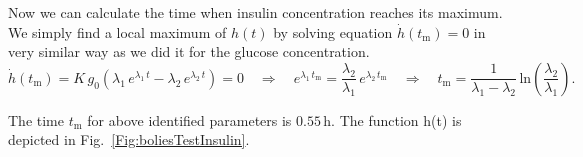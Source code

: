 \documentclass{article}
\providecommand{\m}[1]{\ensuremath{\mathrm{#1}}}
\begin{document}
Now we can calculate the time when insulin concentration reaches its maximum. We simply find a local maximum of $h(t)$ by solving equation $\dot{h}(t_\m{m})=0$ in very similar way as we did it for the glucose concentration.
\begin{equation*}
	\dot{h}(t_\m{m}) = K\,g_0 \left( \lambda_1\,e^{\lambda_1 \, t} - \lambda_2\,e^{\lambda_2 \, t} \right) = 0		\quad\Rightarrow\quad
	e^{\lambda_1\,t_\m{m}} = \frac{\lambda_2}{\lambda_1}\,e^{\lambda_2\,t_\m{m}} 	\quad\Rightarrow\quad
	t_\m{m} = \frac{1}{\lambda_1 - \lambda_2}\,\m{ln}\left(\frac{\lambda_2}{\lambda_1}\right).
\end{equation*}

The time $t_\m{m}$ for above identified parameters is $0.55\,\si{\hour}$. The function h(t) is depicted in Fig.~\ref{Fig:boliesTestInsulin}.
\end{document}
